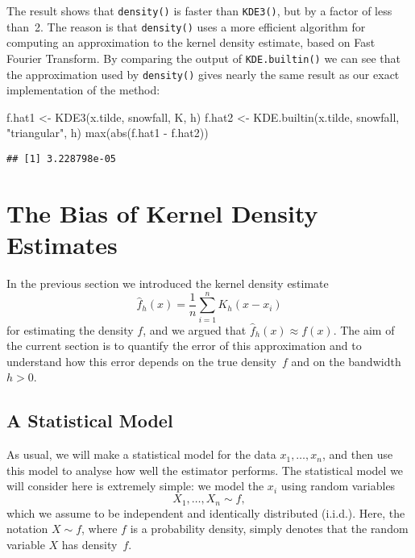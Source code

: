 \documentclass[
  a4paper,
]{article}
\newenvironment{Shaded}{\begin{snugshade}}{\end{snugshade}}
\newcommand{\FunctionTok}[1]{\textcolor[rgb]{0.00,0.00,0.00}{#1}}
\newcommand{\NormalTok}[1]{#1}
\newcommand{\OtherTok}[1]{\textcolor[rgb]{0.56,0.35,0.01}{#1}}
\newcommand{\SpecialCharTok}[1]{\textcolor[rgb]{0.00,0.00,0.00}{#1}}
\newcommand{\StringTok}[1]{\textcolor[rgb]{0.31,0.60,0.02}{#1}}
\theoremstyle{definition}
\theoremstyle{definition}
\theoremstyle{definition}
\theoremstyle{definition}
\theoremstyle{remark}
\begin{document}
The result shows that \texttt{density()} is faster than \texttt{KDE3()}, but by
a factor of less than~2. The reason is that \texttt{density()} uses a
more efficient algorithm for computing an approximation to
the kernel density estimate, based on Fast Fourier Transform.
By comparing the output of \texttt{KDE.builtin()} we can see that the
approximation used by \texttt{density()} gives nearly the same result as our
exact implementation of the method:

\begin{Shaded}
\begin{Highlighting}[]
\NormalTok{f.hat1 }\OtherTok{\textless{}{-}} \FunctionTok{KDE3}\NormalTok{(x.tilde, snowfall, K, h)}
\NormalTok{f.hat2 }\OtherTok{\textless{}{-}} \FunctionTok{KDE.builtin}\NormalTok{(x.tilde, snowfall, }\StringTok{"triangular"}\NormalTok{, h)}
\FunctionTok{max}\NormalTok{(}\FunctionTok{abs}\NormalTok{(f.hat1 }\SpecialCharTok{{-}}\NormalTok{ f.hat2))}
\end{Highlighting}
\end{Shaded}

\begin{verbatim}
## [1] 3.228798e-05
\end{verbatim}

\clearpage

\hypertarget{X02-Bias}{%
\section{The Bias of Kernel Density Estimates}\label{X02-Bias}}

In the previous section we introduced the kernel density estimate
\begin{equation}
  \hat f_h(x)
  = \frac{1}{n} \sum_{i=1}^n K_h(x - x_i)  \label{eq:KDE-est}
\end{equation}
for estimating the density \(f\), and we argued that \(\hat f_h(x) \approx f(x)\).
The aim of the current section is to quantify the error of this approximation
and to understand how this error depends on the true density~\(f\)
and on the bandwidth~\(h > 0\).

\hypertarget{a-statistical-model}{%
\subsection{A Statistical Model}\label{a-statistical-model}}

As usual, we will make a statistical model for the data \(x_1, \ldots, x_n\),
and then use this model to analyse how well the estimator performs.
The statistical model we will consider here is extremely simple: we
model the \(x_i\) using random variables
\begin{equation}
  X_1, \ldots, X_n \sim f,  \label{eq:KDE-model}
\end{equation}
which we assume to be independent and identically distributed (i.i.d.).
Here, the notation \(X \sim f\), where \(f\) is a probability density, simply
denotes that the random variable \(X\) has density~\(f\).
\end{document}
